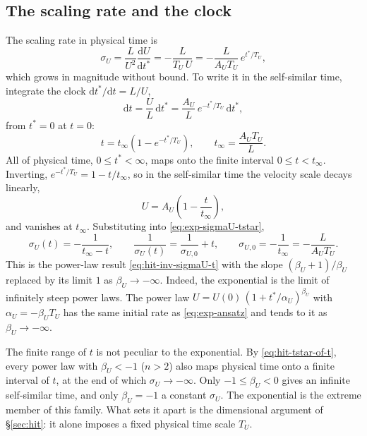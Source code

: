 \documentclass{article}
\begin{document}
\subsection{The scaling rate and the clock}\label{ssec:exp-sigma}
The scaling rate in physical time is
\begin{equation}\label{eq:exp-sigmaU-tstar}
  \sigma_U = \frac{L}{U^2}\frac{\mathrm{d} U}{\mathrm{d} t^*}
  = -\frac{L}{T_U\, U}
  = -\frac{L}{A_U T_U}\, e^{t^*/T_U} ,
\end{equation}
which grows in magnitude without bound. To write it in the self-similar time,
integrate the clock $\mathrm{d}t^*/\mathrm{d}t = L/U$,
\begin{equation}
  \mathrm{d}t = \frac{U}{L}\, \mathrm{d}t^* = \frac{A_U}{L}\, e^{-t^*/T_U}\, \mathrm{d}t^* ,
\end{equation}
from $t^* = 0$ at $t = 0$:
\begin{equation}\label{eq:exp-t-of-tstar}
  t = t_\infty \left( 1 - e^{-t^*/T_U} \right),
  \qquad
  t_\infty = \frac{A_U T_U}{L} .
\end{equation}
All of physical time, $0 \le t^* < \infty$, maps onto the finite interval
$0 \le t < t_\infty$. Inverting,
$e^{-t^*/T_U} = 1 - t/t_\infty$, so in the self-similar time the velocity scale
decays linearly,
\begin{equation}\label{eq:exp-U-of-t}
  U = A_U \left( 1 - \frac{t}{t_\infty} \right),
\end{equation}
and vanishes at $t_\infty$. Substituting into \eqref{eq:exp-sigmaU-tstar},
\begin{equation}\label{eq:exp-sigmaU-t}
  \sigma_U(t) = -\frac{1}{t_\infty - t},
  \qquad
  \frac{1}{\sigma_U(t)} = \frac{1}{\sigma_{U,0}} + t,
  \qquad
  \sigma_{U,0} = -\frac{1}{t_\infty} = -\frac{L}{A_U T_U} .
\end{equation}
This is the power-law result \eqref{eq:hit-inv-sigmaU-t} with the slope
$(\beta_U + 1)/\beta_U$ replaced by its limit $1$ as $\beta_U \to -\infty$.
Indeed, the exponential is the limit of infinitely steep power laws. The power
law $U = U(0)\, (1 + t^*/\alpha_U)^{\beta_U}$ with $\alpha_U = -\beta_U T_U$ has
the same initial rate as \eqref{eq:exp-ansatz} and tends to it as
$\beta_U \to -\infty$.
\par
The finite range of $t$ is not peculiar to the exponential. By
\eqref{eq:hit-tstar-of-t}, every power law with $\beta_U < -1$ ($n > 2$) also
maps physical time onto a finite interval of $t$, at the end of which
$\sigma_U \to -\infty$. Only $-1 \le \beta_U < 0$ gives an infinite
self-similar time, and only $\beta_U = -1$ a constant $\sigma_U$. The
exponential is the extreme member of this family. What sets it apart is the
dimensional argument of \S\ref{sec:hit}: it alone imposes a fixed physical
time scale $T_U$.
\end{document}
